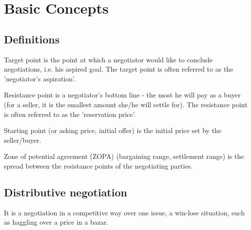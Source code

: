 \section{Basic Concepts}

\subsection{Definitions}

\begin{definition}
    Target point is the point at which a negotiator would like to conclude
    negotiations, i.e. his aspired goal. The target point is often referred to
    as the 'negotiator's aspiration'.
\end{definition}

\begin{definition}
    Resistance point is a negotiator's bottom line - the most he will pay as a
    buyer (for a seller, it is the smallest amount she/he will settle for).
    The resistance point is often referred to as the 'reservation price'.
\end{definition}

\begin{definition}
    Starting point (or asking price, initial offer) is the initial price set by the
    seller/buyer.
\end{definition}

\begin{definition}[ZOPA]
    Zone of potential agreement (ZOPA) (bargaining range, settlement range)
    is the spread between the resistance points of the negotiating parties.
\end{definition}

\subsection{Distributive negotiation}

It is a negotiation in a competitive way over one issue, a win-lose situation,
such as haggling over a price in a bazar.

\begin{example}
\end{example}

